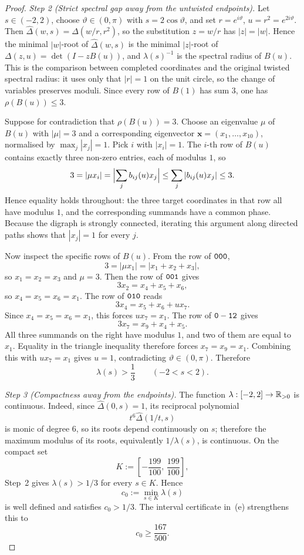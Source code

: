 \begin{proof}
\medskip
\noindent\textit{Step 2 (Strict spectral gap away from the untwisted
endpoints).}\quad
Let \(s\in(-2,2)\), choose \(\vartheta\in(0,\pi)\) with
\(s=2\cos\vartheta\), and set \(r=e^{i\vartheta}\), \(u=r^2=e^{2i\vartheta}\).
Then \(\widehat\Delta(w,s)=\Delta(w/r,r^2)\), so
the substitution \(z=w/r\) has \(|z|=|w|\). Hence the minimal
\(|w|\)-root of \(\widehat\Delta(w,s)\) is the minimal \(|z|\)-root of
\(\Delta(z,u)=\det(I-zB(u))\), and \(\lambda(s)^{-1}\) is the spectral
radius of \(B(u)\). This is the comparison between completed
coordinates and the original twisted spectral radius: it uses only that
\(|r|=1\) on the unit circle, so the change of variables preserves
moduli. Since every row
of \(B(1)\) has sum \(3\), one has \(\rho(B(u))\le 3\).

Suppose for contradiction that \(\rho(B(u))=3\). Choose an eigenvalue
\(\mu\) of \(B(u)\) with \(|\mu|=3\) and a corresponding eigenvector
\(\mathbf{x}=(x_1,\dots,x_{10})\), normalised by
\(\max_j |x_j|=1\). Pick \(i\) with \(|x_i|=1\). The \(i\)-th row of
\(B(u)\) contains exactly three non-zero entries, each of modulus \(1\),
so
\[
  3=|\mu x_i|
   =\Bigl|\sum_j b_{ij}(u)x_j\Bigr|
  \le \sum_j |b_{ij}(u)x_j|
  \le 3.
\]
Hence equality holds throughout: the three target coordinates in that
row all have modulus \(1\), and the corresponding summands have a
common phase. Because the digraph is strongly connected, iterating this
argument along directed paths shows that \(|x_j|=1\) for every
\(j\).

Now inspect the specific rows of \(B(u)\). From the row of
\(\mathtt{000}\),
\[
  3=|\mu x_1|=|x_1+x_2+x_3|,
\]
so \(x_1=x_2=x_3\) and \(\mu=3\). Then the row of
\(\mathtt{001}\) gives
\[
  3x_2=x_4+x_5+x_6,
\]
so \(x_4=x_5=x_6=x_1\). The row of \(\mathtt{010}\) reads
\[
  3x_4=x_5+x_6+ux_7.
\]
Since \(x_4=x_5=x_6=x_1\), this forces \(ux_7=x_1\). The row of
\(\mathtt{0-12}\) gives
\[
  3x_7=x_9+x_4+x_5.
\]
All three summands on the right have modulus \(1\), and two of them
are equal to \(x_1\). Equality in the triangle inequality therefore
forces \(x_7=x_9=x_1\). Combining this with \(ux_7=x_1\) gives
\(u=1\), contradicting \(\vartheta\in(0,\pi)\). Therefore
\[
  \lambda(s)>\frac13
  \qquad (-2<s<2).
\]

\medskip
\noindent\textit{Step 3 (Compactness away from the endpoints).}\quad
The function \(\lambda:[-2,2]\to\mathbb{R}_{>0}\) is continuous. Indeed, since
\(\widehat\Delta(0,s)=1\), its reciprocal polynomial
\[
  t^6\widehat\Delta(1/t,s)
\]
is monic of degree \(6\), so its roots depend continuously on \(s\);
therefore the maximum modulus of its roots, equivalently \(1/\lambda(s)\),
is continuous. On the compact
set
\[
  K:=\left[-\frac{199}{100},\,\frac{199}{100}\right],
\]
Step~2 gives \(\lambda(s)>1/3\) for every \(s\in K\). Hence
\[
  c_0:=\min_{s\in K}\lambda(s)
\]
is well defined and satisfies \(c_0>1/3\).
The interval certificate in
\,\textup{(e)} strengthens this to
\[
  c_0\ge\frac{167}{500}.
\]


\end{proof}
